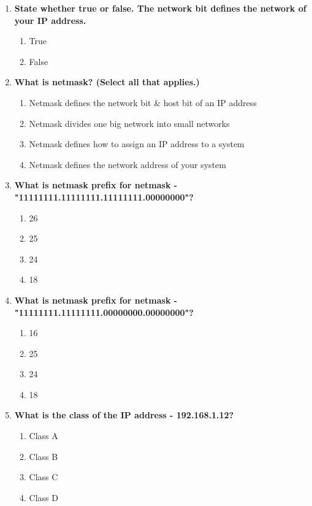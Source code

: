 \begin{flushleft}
\begin{enumerate}
		\item \textbf{State whether true or false. The network bit defines the network of your IP address.}
		\begin{enumerate}[label=(\alph*)]
			\item True  %
			\item False
		\end{enumerate}
		\bigskip
		\bigskip	
		\newpage
		\item \textbf{What is netmask? (Select all that applies.)}
		\begin{enumerate}[label=(\alph*)]
			\item Netmask defines the network bit \& host bit of an IP address %
			\item Netmask divides one big network into small networks %
			\item Netmask defines how to assign an IP address to a system
			\item Netmask defines the network address of your system
		\end{enumerate}
		\bigskip
		\bigskip		
		

		\item \textbf{What is netmask prefix for netmask - "11111111.11111111.11111111.00000000"?}
		\begin{enumerate}[label=(\alph*)]
			\item 26
			\item 25
			\item 24  %
			\item 18
		\end{enumerate}
		\bigskip
		\bigskip

		\item \textbf{What is netmask prefix for netmask - "11111111.11111111.00000000.00000000"?}
		\begin{enumerate}[label=(\alph*)]
			\item 16  %
			\item 25
			\item 24  
			\item 18
		\end{enumerate}
		\bigskip
		\bigskip

		\item \textbf{What is the class of the IP address - 192.168.1.12?}
		\begin{enumerate}[label=(\alph*)]
			\item Class A
			\item Class B
			\item Class C  %
			\item Class D
		\end{enumerate}
		\bigskip
		\bigskip


\end{enumerate}
\end{flushleft}
